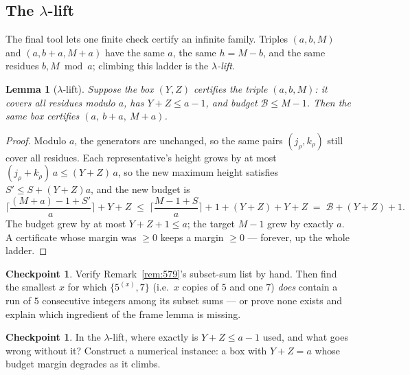\documentclass[11pt,reqno]{amsart}
\theoremstyle{plain}
\newtheorem{lemma}[theorem]{Lemma}
\theoremstyle{definition}
\newtheorem{checkpoint}[theorem]{Checkpoint}   %
\theoremstyle{remark}
\begin{document}
\subsection{The \texorpdfstring{$\lambda$}{lambda}-lift}

The final tool lets one finite check certify an infinite family. Triples $(a, b,
M)$ and $(a, b + a, M + a)$ have the same $a$, the same $h = M - b$, and the same
residues $b, M \bmod a$; climbing this ladder is the \emph{$\lambda$-lift}.

\begin{lemma}[$\lambda$-lift]\label{lem:lift-friendly}
Suppose the box $(Y, Z)$ certifies the triple $(a, b, M)$: it covers all residues
modulo $a$, has $Y + Z \le a - 1$, and budget $\mathcal{B} \le M - 1$. Then the
\emph{same} box certifies $(a,\ b + a,\ M + a)$.
\end{lemma}

\begin{proof}
Modulo $a$, the generators are unchanged, so the same pairs $(j_\rho, k_\rho)$
still cover all residues. Each representative's height grows by at most
$(j_\rho + k_\rho)\,a \le (Y + Z)\,a$, so the new maximum height satisfies
$S' \le S + (Y+Z)a$, and the new budget is
\[
  \Big\lceil \frac{(M + a) - 1 + S'}{a} \Big\rceil + Y + Z
  \;\le\; \Big\lceil \frac{M - 1 + S}{a} \Big\rceil + 1 + (Y + Z) + Y + Z
  \;=\; \mathcal{B} + (Y + Z) + 1 .
\]
The budget grew by at most $Y + Z + 1 \le a$; the target $M - 1$ grew by exactly
$a$. A certificate whose margin was $\ge 0$ keeps a margin $\ge 0$ --- forever, up
the whole ladder.
\end{proof}

\begin{checkpoint}
Verify Remark~\ref{rem:579}'s subset-sum list by hand. Then find the smallest $x$
for which $\{5^{(x)}, 7\}$ (i.e.\ $x$ copies of $5$ and one $7$) \emph{does}
contain a run of $5$ consecutive integers among its subset sums --- or prove none
exists and explain which ingredient of the frame lemma is missing.
\end{checkpoint}

\begin{checkpoint}
In the $\lambda$-lift, where exactly is $Y + Z \le a - 1$ used, and what goes
wrong without it? Construct a numerical instance: a box with $Y + Z = a$ whose
budget margin degrades as it climbs.
\end{checkpoint}

\end{document}
